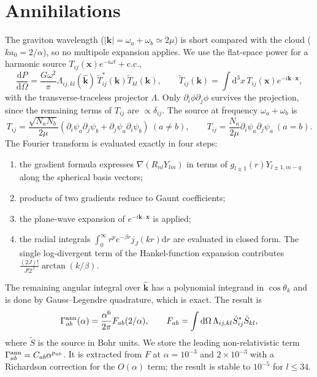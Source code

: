\documentclass[11pt]{article}
\newcommand{\dd}{\mathrm{d}}
\begin{document}
\section{Annihilations}
The graviton wavelength ($|\mathbf k|=\omega_a+\omega_b\simeq 2\mu$) is short compared with the cloud ($k a_0 = 2/\alpha$), so no multipole expansion applies. We use the flat-space power for a harmonic source $T_{ij}(\mathbf x)e^{-i\omega t}+\mathrm{c.c.}$,
\begin{equation}
\frac{\dd P}{\dd\Omega}=\frac{G\omega^2}{\pi}\Lambda_{ij,kl}(\hat{\mathbf k})\,\tilde T^*_{ij}(\mathbf k)\tilde T_{kl}(\mathbf k),\qquad
\tilde T_{ij}(\mathbf k)=\int\dd^3x\,T_{ij}(\mathbf x)e^{-i\mathbf k\cdot\mathbf x},
\end{equation}
with the transverse-traceless projector $\Lambda$. Only $\partial_i\phi\partial_j\phi$ survives the projection, since the remaining terms of $T_{ij}$ are $\propto\delta_{ij}$. The source at frequency $\omega_a+\omega_b$ is
\begin{equation}
T_{ij}=\frac{\sqrt{N_aN_b}}{2\mu}\left(\partial_i\psi_a\partial_j\psi_b+\partial_j\psi_a\partial_i\psi_b\right)\ (a\neq b),\qquad
T_{ij}=\frac{N_a}{2\mu}\partial_i\psi_a\partial_j\psi_a\ (a=b).
\end{equation}
The Fourier transform is evaluated exactly in four steps:
\begin{enumerate}
\item the gradient formula expresses $\nabla(R_{nl}Y_{lm})$ in terms of $g_{l\pm1}(r)Y_{l\pm1,m-q}$ along the spherical basis vectors;
\item products of two gradients reduce to Gaunt coefficients;
\item the plane-wave expansion of $e^{-i\mathbf k\cdot\mathbf x}$ is applied;
\item the radial integrals $\int_0^\infty r^p e^{-\beta r}j_J(kr)\dd r$ are evaluated in closed form. The single log-divergent term of the Hankel-function expansion contributes $\frac{(2J)!}{J!2^J}\arctan(k/\beta)$.
\end{enumerate}
The remaining angular integral over $\hat{\mathbf k}$ has a polynomial integrand in $\cos\theta_k$ and is done by Gauss--Legendre quadrature, which is exact. The result is
\begin{equation}
\Gamma^{\rm ann}_{ab}(\alpha)=\frac{\alpha^6}{2\pi}F_{ab}(2/\alpha),\qquad F_{ab}=\int\dd\Omega\,\Lambda_{ij,kl}\tilde S^*_{ij}\tilde S_{kl},
\end{equation}
where $\tilde S$ is the source in Bohr units. We store the leading non-relativistic term $\Gamma^{\rm ann}_{ab}=C_{ab}\alpha^{p_{ab}}$. It is extracted from $F$ at $\alpha=10^{-3}$ and $2\times10^{-3}$ with a Richardson correction for the $O(\alpha)$ term; the result is stable to $10^{-5}$ for $l\le 34$.
\end{document}
